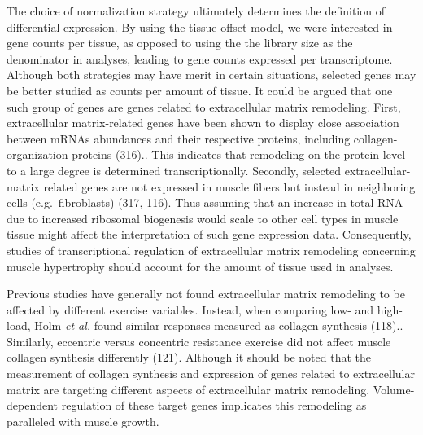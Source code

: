 \documentclass[twoside,10pt]{gihclass} %
\begin{document}
The choice of normalization strategy ultimately determines the definition of differential expression. By using the tissue offset model, we were interested in gene counts per tissue, as opposed to using the the library size as the denominator in analyses, leading to gene counts expressed per transcriptome. Although both strategies may have merit in certain situations, selected genes may be better studied as counts per amount of tissue. It could be argued that one such group of genes are genes related to extracellular matrix remodeling.
First, extracellular matrix-related genes have been shown to display close association between mRNAs abundances and their respective proteins, including collagen-organization proteins (316)..
This indicates that remodeling on the protein level to a large degree is determined transcriptionally.
Secondly, selected extracellular-matrix related genes are not expressed in muscle fibers but instead in neighboring cells (e.g.~fibroblasts)
(317, 116).
Thus assuming that an increase in total RNA due to increased ribosomal biogenesis would scale to other cell types in muscle tissue might affect the interpretation of such gene expression data.
Consequently, studies of transcriptional regulation of extracellular matrix remodeling concerning muscle hypertrophy should account for the amount of tissue used in analyses.

Previous studies have generally not found extracellular matrix remodeling to be affected by different exercise variables. Instead, when comparing low- and high-load, Holm \emph{et al.} found similar responses measured as collagen synthesis (118)..
Similarly, eccentric versus concentric resistance exercise did not affect muscle collagen synthesis differently
(121).
Although it should be noted that the measurement of collagen synthesis and expression of genes related to extracellular matrix are targeting different aspects of extracellular matrix remodeling. Volume-dependent regulation of these target genes implicates this remodeling as paralleled with muscle growth.
\end{document}
